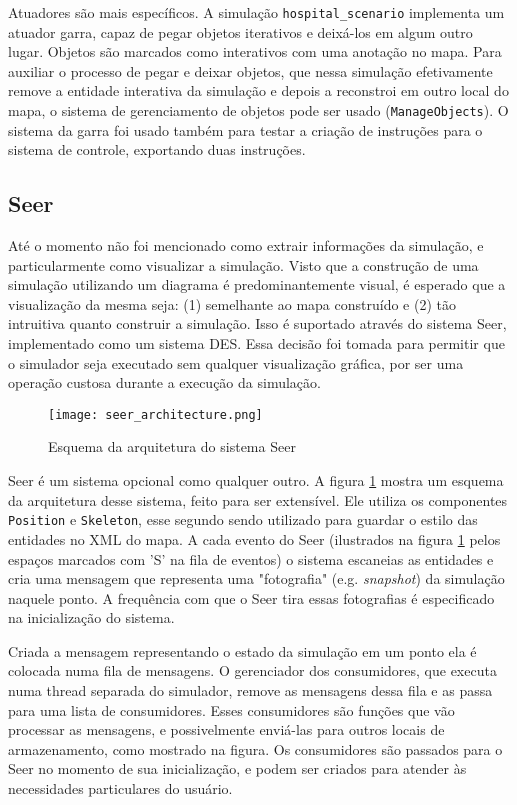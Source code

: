 Atuadores são mais específicos. A simulação \texttt{hospital\_scenario} implementa um atuador garra, capaz de pegar objetos iterativos e deixá-los em algum outro lugar. Objetos são marcados como interativos com uma anotação no mapa. Para auxiliar o processo de pegar e deixar objetos, que nessa simulação efetivamente remove a entidade interativa da simulação e depois a reconstroi em outro local do mapa, o sistema de gerenciamento de objetos pode ser usado (\texttt{ManageObjects}). O sistema da garra foi usado também para testar a criação de instruções para o sistema de controle, exportando duas instruções.

\subsection{Seer}
\label{sec:seer}

Até o momento não foi mencionado como extrair informações da simulação, e particularmente como visualizar a simulação. Visto que a construção de uma simulação utilizando um diagrama é predominantemente visual, é esperado que a visualização da mesma seja: (1) semelhante ao mapa construído e (2) tão intruitiva quanto construir a simulação. Isso é suportado através do sistema Seer, implementado como um sistema DES. Essa decisão foi tomada para permitir que o simulador seja executado sem qualquer visualização gráfica, por ser uma operação custosa durante a execução da simulação.

\begin{figure}[ht]
    \centering
    \texttt{[image: seer\_architecture.png]}
    \caption{Esquema da arquitetura do sistema Seer}
    \label{fig:seer_architecture}
\end{figure}

Seer é um sistema opcional como qualquer outro. A figura \ref{fig:seer_architecture} mostra um esquema da arquitetura desse sistema, feito para ser extensível. Ele utiliza os componentes \texttt{Position} e \texttt{Skeleton}, esse segundo sendo utilizado para guardar o estilo das entidades no XML do mapa. A cada evento do Seer (ilustrados na figura \ref{fig:seer_architecture} pelos espaços marcados com 'S' na fila de eventos) o sistema escaneias as entidades e cria uma mensagem que representa uma "fotografia" (e.g. \textit{snapshot}) da simulação naquele ponto. A frequência com que o Seer tira essas fotografias é especificado na inicialização do sistema. 

Criada a mensagem representando o estado da simulação em um ponto ela é colocada numa fila de mensagens. O gerenciador dos consumidores, que executa numa thread separada do simulador, remove as mensagens dessa fila e as passa para uma lista de consumidores. Esses consumidores são funções que vão processar as mensagens, e possivelmente enviá-las para outros locais de armazenamento, como mostrado na figura. Os consumidores são passados para o Seer no momento de sua inicialização, e podem ser criados para atender às necessidades particulares do usuário. 


